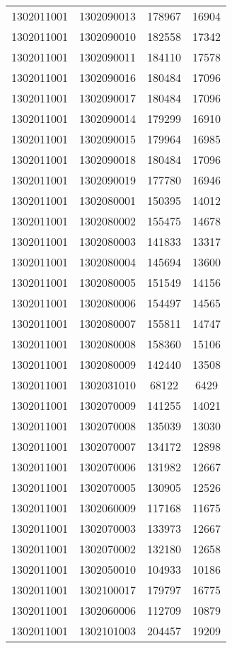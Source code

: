 \begin{longtable}[h]{llcc}
		1302011001 & 1302090013 & 178967 & 16904\\
		1302011001 & 1302090010 & 182558 & 17342\\
		1302011001 & 1302090011 & 184110 & 17578\\
		1302011001 & 1302090016 & 180484 & 17096\\
		1302011001 & 1302090017 & 180484 & 17096\\
		1302011001 & 1302090014 & 179299 & 16910\\
		1302011001 & 1302090015 & 179964 & 16985\\
		1302011001 & 1302090018 & 180484 & 17096\\
		1302011001 & 1302090019 & 177780 & 16946\\
		1302011001 & 1302080001 & 150395 & 14012\\
		1302011001 & 1302080002 & 155475 & 14678\\
		1302011001 & 1302080003 & 141833 & 13317\\
		1302011001 & 1302080004 & 145694 & 13600\\
		1302011001 & 1302080005 & 151549 & 14156\\
		1302011001 & 1302080006 & 154497 & 14565\\
		1302011001 & 1302080007 & 155811 & 14747\\
		1302011001 & 1302080008 & 158360 & 15106\\
		1302011001 & 1302080009 & 142440 & 13508\\
		1302011001 & 1302031010 & 68122 & 6429\\
		1302011001 & 1302070009 & 141255 & 14021\\
		1302011001 & 1302070008 & 135039 & 13030\\
		1302011001 & 1302070007 & 134172 & 12898\\
		1302011001 & 1302070006 & 131982 & 12667\\
		1302011001 & 1302070005 & 130905 & 12526\\
		1302011001 & 1302060009 & 117168 & 11675\\
		1302011001 & 1302070003 & 133973 & 12667\\
		1302011001 & 1302070002 & 132180 & 12658\\
		1302011001 & 1302050010 & 104933 & 10186\\
		1302011001 & 1302100017 & 179797 & 16775\\
		1302011001 & 1302060006 & 112709 & 10879\\
		1302011001 & 1302101003 & 204457 & 19209\\

\end{longtable}
